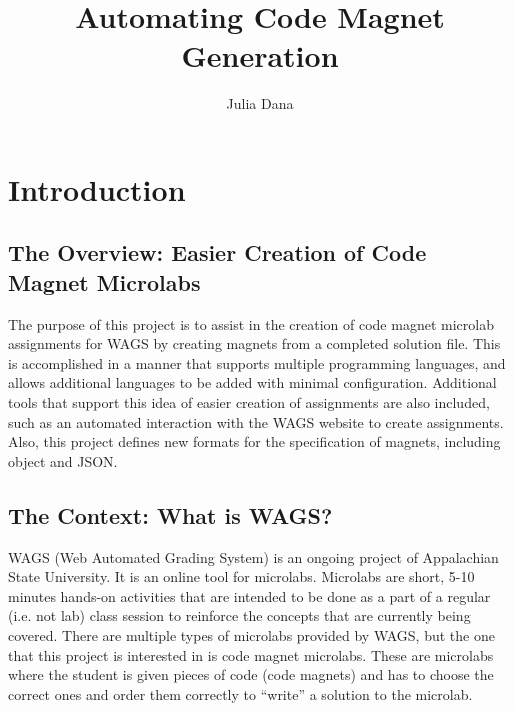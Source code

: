 \documentclass[letter,10pt]{article}
\title{Automating Code Magnet Generation}
\author{Julia Dana}
\date{}
\begin{document}
\maketitle


\pagebreak
\tableofcontents

\pagebreak

\section{Introduction}

\subsection{The Overview: Easier Creation of Code Magnet Microlabs}

The purpose of this project is to assist in the creation of code magnet 
microlab assignments for WAGS by creating magnets from a completed 
solution file. This is accomplished in a manner that supports multiple 
programming languages, and allows additional languages to be added with 
minimal configuration. Additional tools that support this idea of 
easier creation of assignments are also included, such as an automated
interaction with the WAGS website to create assignments. Also, this 
project defines new formats for the specification of magnets, including 
object and JSON. 

\subsection{The Context: What is WAGS?}

WAGS (Web Automated Grading System) is an ongoing project of 
Appalachian State University. It is an online tool for microlabs. 
Microlabs are short, 5-10 minutes hands-on activities that are 
intended to be done as a part of a regular (i.e. not lab) class session 
to reinforce the concepts that are currently being covered. There 
are multiple types of microlabs provided by WAGS, but the one that 
this project is interested in is code magnet microlabs. These are 
microlabs where the student is given pieces of code (code magnets) and 
has to choose the correct ones and order them correctly to “write” a 
solution to the microlab.

\end{document}
